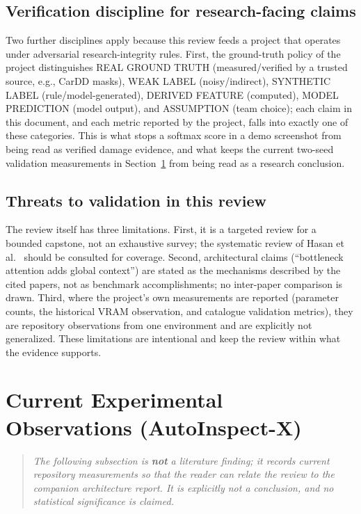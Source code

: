 \documentclass[conference]{IEEEtran}
\begin{document}
\subsection{Verification discipline for research-facing claims}
Two further disciplines apply because this review feeds a project that operates
under adversarial research-integrity rules. First, the ground-truth policy of
the project distinguishes REAL GROUND TRUTH (measured/verified by a trusted
source, e.g., CarDD masks), WEAK LABEL (noisy/indirect), SYNTHETIC LABEL
(rule/model-generated), DERIVED FEATURE (computed), MODEL PREDICTION (model
output), and ASSUMPTION (team choice); each claim in this document, and each
metric reported by the project, falls into exactly one of these categories. This
is what stops a softmax score in a demo screenshot from being read as verified
damage evidence, and what keeps the current two-seed validation measurements
in Section~\ref{sec:current-observations} from being read as a research
conclusion.
\subsection{Threats to validation in this review}
The review itself has three limitations. First, it is a targeted review for a
bounded capstone, not an exhaustive survey; the systematic review of Hasan
et al.~\cite{hasan2025} should be consulted for coverage. Second, architectural
claims (``bottleneck attention adds global context'') are stated as the
mechanisms described by the cited papers, not as benchmark accomplishments; no
inter-paper comparison is drawn. Third, where the project's own measurements are
reported (parameter counts, the historical VRAM observation, and catalogue
validation metrics), they are repository observations from one environment and
are explicitly not generalized. These limitations are intentional and keep the
review within what the evidence supports.

\section{Current Experimental Observations (AutoInspect-X)}
\label{sec:current-observations}
\begin{quote}
\textit{The following subsection is \textbf{not} a literature finding; it records
current repository measurements so that the reader can relate the review to
the companion architecture report. It is explicitly \emph{not} a conclusion,
and no statistical significance is claimed.}
\end{quote}
\end{document}
